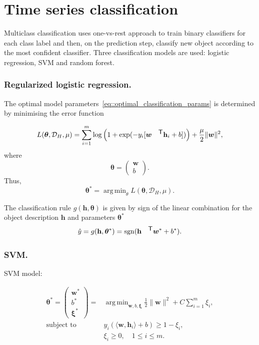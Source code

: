 \documentclass{llncs}
\DeclareMathOperator{\sgn}{\mathop{sgn}}
\DeclareMathOperator*{\argmin}{arg\,min}
\newcommand{\T}{{\mbox{\footnotesize\sffamily\upshape\mdseries T}}}
\begin{document}
\section{Time series classification}
Multiclass classification uses one-vs-rest approach to train binary classifiers for each class label and then, on the prediction step, classify new object according to the most confident classifier. Three classification models are used: logistic regression, SVM and random forest.

\subsubsection{Regularized logistic regression.}
The optimal model parameters~\eqref{eq::optimal_classification_params} is determined by minimising the error function

\begin{equation*}
L(\bm{\theta}, \mathcal{D}_H, \mu) = \sum_{i=1}^{m} \log\left(1 + \exp(-y_i [\bm{w}^{\T} \mathbf{h}_i + b])\right) + \frac{\mu}{2} \|\bm{w}\|^2,
\end{equation*}
where 
\begin{equation*}
\bm{\theta}  = \begin{pmatrix}
\bm{w} \\ b
\end{pmatrix}.
\end{equation*}
Thus, 
\begin{equation*}
\bm{\theta}^* = \argmin_{\mathbb{\theta}} L(\bm{\theta}, \mathcal{D}_H, \mu).
\end{equation*}

The classification rule $g(\mathbf{h}, \bm{\theta})$ is given by sign of the linear combination for the object description $\mathbf{h}$ and parameters $\bm{\theta}^*$
\begin{equation*}
\hat{y} = g(\mathbf{h}, \bm{\theta}^*) = \sgn(\mathbf{h}^{\T} \bm{w}^* + b^*).
\end{equation*}

\subsubsection{SVM.}
SVM model:

\begin{align*}
\bm{\theta}^*  = \begin{pmatrix}
\bm{w^*} \\ b^* \\ \bm{\xi}^*
\end{pmatrix}= &\argmin_{\bm{w}, b, \bm{\xi}}  \frac{1}{2} \|\bm{w}\|^2 + C\sum_{i=1}^{m} \xi_i,\\
\mbox{subject to} \quad &y_i (\langle \bm{w}, \mathbf{h}_i \rangle + b) \geq 1 - \xi_i,\\
&\xi_i \geq 0, \quad 1 \leq i \leq m.
\end{align*}
\end{document}
